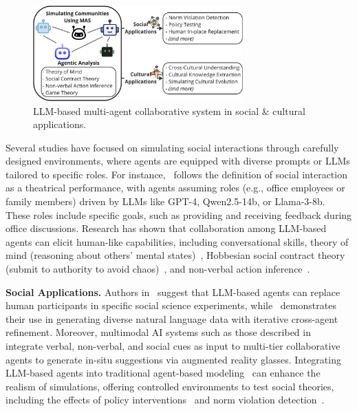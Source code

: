 \documentclass[acmsmall,nonacm]{acmart}
\begin{document}
        \begin{figure}
            \includegraphics[width=0.72\textwidth]{image-lib/social_cultural_applications.pdf}
            \caption{LLM-based multi-agent collaborative system in social \& cultural applications.}\label{fig:social_cultural_applications}
            \Description{}
        \end{figure}

        Several studies have focused on simulating social interactions through carefully designed environments, where agents are equipped with diverse prompts or LLMs tailored to specific roles. For instance,~\cite{mou2024agentsensebenchmarkingsocialintelligence} follows the definition of social interaction as a theatrical performance, with agents assuming roles (e.g., office employees or family members) driven by LLMs like GPT-4, Qwen2.5-14b, or Llama-3-8b. These roles include specific goals, such as providing and receiving feedback during office discussions. Research has shown that collaboration among LLM-based agents can elicit human-like capabilities, including conversational skills, theory of mind (reasoning about others' mental states)~\cite{li-etal-2023-theory,abdelnabi2024cooperation}, Hobbesian social contract theory (submit to authority to avoid chaos)~\cite{dai2024artificialleviathanexploringsocial}, and non-verbal action inference~\cite{Ying2024,liu2024largelanguagemodelsassume}.

        \textbf{Social Applications.} Authors in~\cite{DILLION2023597,10.5555/3618408.3618425} suggest that LLM-based agents can replace human participants in specific social science experiments, while~\cite{mitra2024agentinstruct} demonstrates their use in generating diverse natural language data with iterative cross-agent refinement. Moreover, multimodal AI systems such as those described in~\cite{yang2024socialmindllmbasedproactivear} integrate verbal, non-verbal, and social cues as input to multi-tier collaborative agents to generate in-situ suggestions via augmented reality glasses. Integrating LLM-based agents into traditional agent-based modeling~\cite{gurcan2024llmaugmentedagentbasedmodellingsocial} can enhance the realism of simulations, offering controlled environments to test social theories, including the effects of policy interventions~\cite{ansaldo2023agentspeak,zeng2024exploring} and norm violation detection~\cite{he2024normviolationdetectionmultiagent}.
\end{document}
